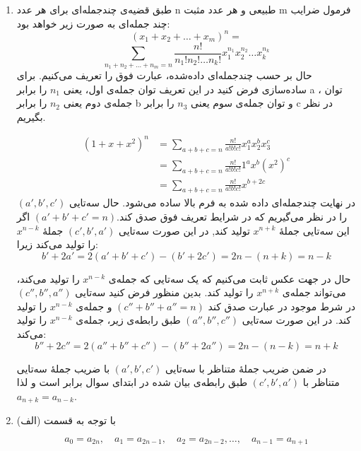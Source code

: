 	\begin{enumerate}
		\item 
        \p
        طبق قضیه‌ی چندجمله‌ای برای هر عدد n طبیعی و هر عدد مثبت m فرمول ضرایب چند جمله‌ای به صورت زیر خواهد بود:
        $$(x_1+x_2+\ldots+x_m)^n = $$
        $$\sum_{n_1+n_2+\ldots+n_m=n} \frac{n!}{n_1!n_2!\ldots n_k!} x_1^{n_1}x_2^{n_2}\ldots x_k^{n_k}$$
        حال بر حسب چندجمله‌ای داده‌شده، عبارت فوق را تعریف می‌کنیم. برای ساده‌سازی فرض کنید در این تعریف توان جمله‌ی اول، یعنی
        $n_1$
        را برابر a ،
        توان جمله‌ی دوم یعنی 
        $n_2$
        را برابر 
        b
        و توان جمله‌ی سوم یعنی
        $n_3$
        را برابر c در نظر بگیریم.
        
        \begin{align*}
		(1+x+x^2)^n &= \sum_{a+b+c=n} \frac{n!}{a!b!c!} x_1^{a} x_2^{b} x_3^{c}\\
		&= \sum_{a+b+c=n} \frac{n!}{a!b!c!} 1^{a} x^{b} (x^2)^{c}\\
		&= \sum_{a+b+c=n} \frac{n!}{a!b!c!} x^{b + 2c}
        \end{align*}
		در نهایت چندجمله‌ای داده شده به فرم بالا ساده می‌شود.
		حال سه‌تایی $(a',b',c')$ را در نظر می‌گیریم که در شرایط تعریف فوق صدق کند.$(a'+b'+c' = n)$
        اگر این سه‌تایی  جملهٔ $x^{n + k}$ تولید کند, در این صورت سه‌تایی $(c', b', a')$ جملهٔ $x^{n - k}$ را تولید می‌کند زیرا:
        $$b' + 2a' = 2(a' + b' + c') - (b' + 2c') = 2n - (n + k) = n -k$$
        
        \p
        حال در جهت عکس ثابت می‌کنیم که یک سه‌تایی که جمله‌ی
        $x^{n-k}$
        را تولید می‌کند، می‌تواند جمله‌ی
        $x^{n+k}$
        را تولید کند. بدین منظور فرض کنید سه‌تایی
        $(c'', b'', a'')$
        در شرط موجود در عبارت صدق کند
        $(c''+b''+a''=n)$
        و جمله‌ی
        $x^{n-k}$
        را تولید کند.
        در این صورت سه‌تایی
        $(a'',b'',c'')$
        طبق رابطه‌ی زیر، جمله‌ی 
        $x^{n-k}$
        را تولید می‌کند:
    	$$b'' + 2c'' = 2(a'' + b'' + c'') - (b'' + 2a'') = 2n - (n - k) = n +k$$
	
        \p
    	در ضمن ضریب جملهٔ متناظر با سه‌تایی $(a', b', c')$ با ضریب جملهٔ سه‌تایی متناظر با $(c', b', a')$ طبق رابطه‌ی بیان شده در ابتدای سوال برابر است و لذا $a_{n + k} = a_{n - k}$.
	
	\item
        \p
    	با توجه به قسمت (الف) 
    
    	$$a_0 = a_{2n},\quad a_1 = a_{2n - 1},\quad a_2 = a_{2n - 2}, \dots ,\quad a_{n - 1} = a_{n + 1}$$
    

\end{enumerate}
